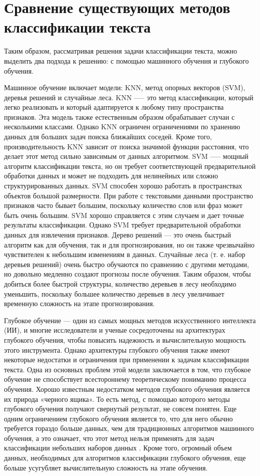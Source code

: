 \section{Сравнение существующих методов классификации текста}
Таким образом, рассматривая решения задачи классификации текста, можно выделить два подхода к решению: с помощью машинного обучения и глубокого обучения.

Машинное обучение включает модели: KNN, метод опорных векторов (SVM), деревья решений и случайные леса. KNN —-- это метод классификации, который легко реализовать и который адаптируется к любому типу пространства признаков. Эта модель также естественным образом обрабатывает случаи с несколькими классами\cite{140, 141}. Однако KNN ограничен ограничениями по хранению данных для больших задач поиска ближайших соседей. Кроме того, производительность KNN зависит от поиска значимой функции расстояния, что делает этот метод сильно зависимым от данных алгоритмом\cite{142, 143}. SVM —-- мощный алгоритм классификации текста, но он требует соответствующей предварительной обработки данных и может не подходить для нелинейных или сложно структурированных данных. SVM способен хорошо работать в пространствах объектов большой размерности. При работе с текстовыми данными пространство признаков часто бывает большим, поскольку количество слов или фраз может быть очень большим. SVM хорошо справляется с этим случаем и дает точные результаты классификации. Однако SVM требует предварительной обработки данных для извлечения признаков. Дерево решений — это очень быстрый алгоритм как для обучения, так и для прогнозирования, но он также чрезвычайно чувствителен к небольшим изменениям в данных\cite{166}. Случайные леса (т. е. набор деревьев решений) очень быстро обучаются по сравнению с другими методами, но довольно медленно создают прогнозы после обучения. Таким образом, чтобы добиться более быстрой структуры, количество деревьев в лесу необходимо уменьшить, поскольку большее количество деревьев в лесу увеличивает временную сложность на этапе прогнозирования.

Глубокое обучение — один из самых мощных методов искусственного интеллекта (ИИ), и многие исследователи и ученые сосредоточены на архитектурах глубокого обучения, чтобы повысить надежность и вычислительную мощность этого инструмента. Однако архитектуры глубокого обучения также имеют некоторые недостатки и ограничения при применении к задачам классификации текста. Одна из основных проблем этой модели заключается в том, что глубокое обучение не способствует всестороннему теоретическому пониманию процесса обучения\cite{202}. Хорошо известным недостатком методов глубокого обучения является их природа «черного ящика»\cite{203, 204}. То есть метод, с помощью которого методы глубокого обучения получают свернутый результат, не совсем понятен. Еще одним ограничением глубокого обучения является то, что для него обычно требуется гораздо больше данных, чем для традиционных алгоритмов машинного обучения, а это означает, что этот метод нельзя применять для задач классификации небольших наборов данных \cite{205,206}. Кроме того, огромный объем данных, необходимых для алгоритмов классификации глубокого обучения, еще больше усугубляет вычислительную сложность на этапе обучения\cite{207}.

